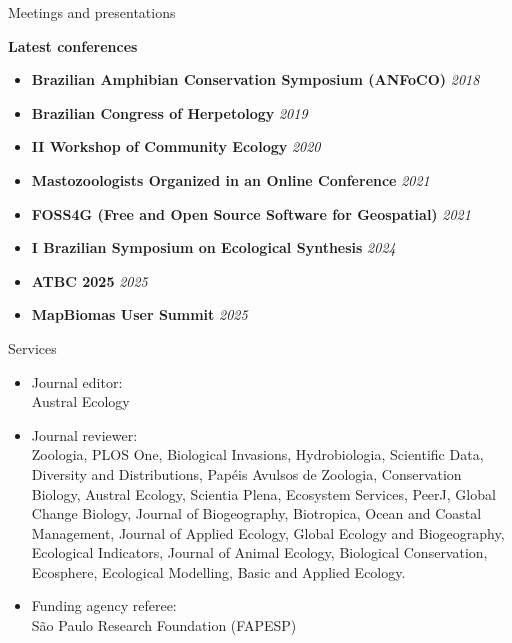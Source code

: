 \documentclass{resume}
\begin{document}
\begin{rSection}{Meetings and presentations}

{\bf Latest conferences}
\begin{itemize}
\item {\bf Brazilian Amphibian Conservation Symposium (ANFoCO)} \hfill{\em 2018}
\item {\bf Brazilian Congress of Herpetology} \hfill{\em 2019}
\item {\bf II Workshop of Community Ecology} \hfill{\em 2020}
\item {\bf Mastozoologists Organized in an Online Conference} \hfill{\em 2021}
\item {\bf FOSS4G (Free and Open Source Software for Geospatial)} \hfill{\em 2021}
\item {\bf I Brazilian Symposium on Ecological Synthesis} \hfill{\em 2024}
\item {\bf ATBC 2025} \hfill{\em 2025}
\item {\bf MapBiomas User Summit} \hfill{\em 2025}
\end{itemize}

\end{rSection}


\begin{rSection}{Services}
\begin{itemize}
\item Journal editor:\\
Austral Ecology

\item Journal reviewer:\\
Zoologia, PLOS One, Biological Invasions, Hydrobiologia, Scientific Data, Diversity and Distributions, Papéis Avulsos de Zoologia, Conservation Biology, Austral Ecology, Scientia Plena, Ecosystem Services, PeerJ, Global Change Biology, Journal of Biogeography, Biotropica, Ocean and Coastal Management, Journal of Applied Ecology, Global Ecology and Biogeography, Ecological Indicators, Journal of Animal Ecology, Biological Conservation, Ecosphere, Ecological Modelling, Basic and Applied Ecology.

\item Funding agency referee:\\
São Paulo Research Foundation (FAPESP)
\end{itemize}
\end{rSection}
\end{document}
